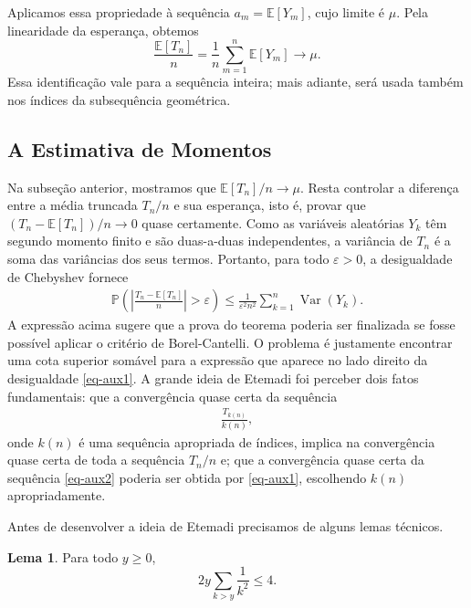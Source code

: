 \documentclass[12pt,portuguese]{article}
\theoremstyle{definition}
\newtheorem{lemma}[lemma]{Lema}
\theoremstyle{plainexercise}
\theoremstyle{starredexercise}
\theoremstyle{definition}
\begin{document}
Aplicamos essa propriedade à sequência $a_m=\mathbb{E}[Y_m]$, cujo limite
é $\mu$. Pela linearidade da esperança, obtemos
\begin{equation}\label{eq:cesaro}
\frac{\mathbb{E}[T_n]}{n}
=
\frac{1}{n}\sum_{m=1}^{n}\mathbb{E}[Y_m]
\longrightarrow\mu.
\end{equation}
Essa identificação vale para a sequência inteira; mais adiante, será usada
também nos índices da subsequência geométrica.

\subsection{A Estimativa de Momentos}\label{subsec:estimativa-momentos}

Na subseção anterior, mostramos que $\mathbb{E}[T_n]/n\to\mu$.
Resta controlar a diferença entre a média truncada $T_n/n$ e sua esperança,
isto é, provar que $(T_n-\mathbb{E}[T_n])/n\to0$ quase certamente.
Como as variáveis aleatórias $Y_k$ têm segundo momento finito e são duas-a-duas independentes,
a variância de $T_n$ é a soma das variâncias dos seus termos. Portanto,
para todo $\varepsilon>0$, a desigualdade de Chebyshev fornece
\begin{align}\label{eq-aux1}
\mathbb{P}\left(
\left|\frac{T_n-\mathbb{E}[T_n]}{n}\right|>\varepsilon
\right)
\leqslant
\frac{1}{\varepsilon^2n^2}
\sum_{k=1}^{n}\operatorname{Var}(Y_k).
\end{align}
A expressão acima sugere que a prova do teorema poderia
ser finalizada se fosse possível aplicar o critério de Borel-Cantelli.
O problema é justamente encontrar uma cota superior somável para a expressão que
aparece no lado direito da desigualdade \eqref{eq-aux1}.
A grande ideia de Etemadi foi perceber dois fatos fundamentais: que a convergência quase certa da sequência
\begin{align}\label{eq-aux2}
\frac{T_{k(n)}}{k(n)},
\end{align}
onde $k(n)$ é uma sequência apropriada de índices, implica na convergência quase certa
de toda a sequência $T_n/n$ e; que a convergência quase certa da sequência \eqref{eq-aux2} poderia
ser obtida por \eqref{eq-aux1}, escolhendo $k(n)$ apropriadamente.

Antes de desenvolver a ideia de Etemadi precisamos de alguns lemas técnicos.

\begin{lemma}\label{lem:harmonica}
Para todo $y\geqslant0$,
\[
2y\sum_{k>y}\frac{1}{k^2}\leqslant4.
\]
\end{lemma}
\end{document}
